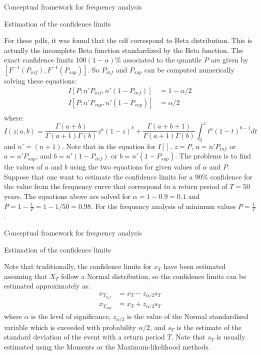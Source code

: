 \documentclass[8pt]{beamer}
\renewcommand{\emph}[1]{\textcolor{myorange}{#1}}
\begin{document}
\begin{frame}{Conceptual framework for  frequency analysis}
    \begin{block}{Estimation of the confidence limits} 
\end{block}
For these \emph{pdf}s, it was found that the  \emph{cdf} correspond to  \emph{Beta distribution}. This is actually the \emph{incomplete Beta function} standardized by the \emph{Beta function}. The exact confidence limits $100(1-\alpha)\%$ associated to the quantile $P$ are given by $[F^{-1}(P_{inf}), F^{-1}(P_{sup})]$. So $P_{inf}$ and $P_{sup}$ can be computed numerically solving these equations:
            \begin{align*}
                I[P; n' P_{inf}, n' (1-P_{inf})] &= 1-\alpha/2 \\
                I[P; n' P_{sup}, n' (1-P_{sup})] &= \alpha/2 \\
            \end{align*}
            where:
            \[
                I(z; a,b) = \frac{\Gamma(a + b)}{\Gamma(a+1) \Gamma (b)} z^a (1-z)^b + \frac{\Gamma(a + b + 1)}{\Gamma(a+1) \Gamma (b)} \int_0^z t^a (1-t)^{b-1} dt
            \]
            and $n' = (n+1)$. Note that in the equation for $I[]$, $z = P$, $a = n' P_{inf}$ or $a = n' P_{sup}$, and $b = n' (1-P_{inf})$ or $b = n' (1-P_{sup})$. The problems is to find the values of $a$ and $b$ using the two equations for given values of $\alpha$ and $P$. Suppose that one want to estimate the confidence limits for a 90\% confidence for the value from the frequency curve that correspond to a return period of $T=50$ years. The equations above are solved for $\alpha = 1-0.9 = 0.1$ and $P = 1 - \frac{1}{T} = 1- 1/50 = 0.98$. For the frequency analysis of minimum values $P = \frac{1}{T}$. 

\end{frame}
\begin{frame}{Conceptual framework for  frequency analysis}
    \begin{block}{Estimation of the confidence limits} 
\end{block}
            Note that traditionally, the confidence limits for $x_T$ have been estimated assuming that $X_T$ follow a \emph{Normal distribution}, so the confidence limits can be estimated approximately as:
            \begin{align*}
                x_{T_{inf}} &= x_T - z_{\alpha/2} s_T \\
                x_{T_{sup}} &= x_T + z_{\alpha/2} s_T 
            \end{align*}
            where $\alpha$ is the level of significance, $z_{\alpha/2}$ is the value of the Normal standardized variable which is exceeded with probability $\alpha/2$, and $s_T$ is the estimate of the standard deviation of the event with a return period $T$. Note that $s_T$ is usually estimated using the Moments or the Maximum-likelihood methods.

\end{frame}
\end{document}
